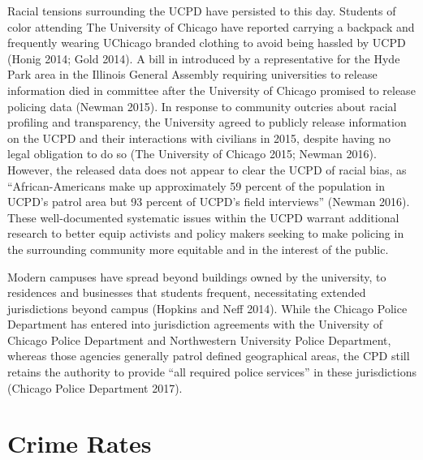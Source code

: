 \documentclass{ucetd}
\begin{document}
Racial tensions surrounding the UCPD have persisted to this day.
Students of color attending The University of Chicago have reported
carrying a backpack and frequently wearing UChicago branded clothing to
avoid being hassled by UCPD (Honig 2014; Gold 2014). A bill in
introduced by a representative for the Hyde Park area in the Illinois
General Assembly requiring universities to release information died in
committee after the University of Chicago promised to release policing
data (Newman 2015). In response to community outcries about racial
profiling and transparency, the University agreed to publicly release
information on the UCPD and their interactions with civilians in 2015,
despite having no legal obligation to do so (The University of Chicago
2015; Newman 2016). However, the released data does not appear to clear
the UCPD of racial bias, as ``African-Americans make up approximately 59
percent of the population in UCPD's patrol area but 93 percent of UCPD's
field interviews'' (Newman 2016). These well-documented systematic
issues within the UCPD warrant additional research to better equip
activists and policy makers seeking to make policing in the surrounding
community more equitable and in the interest of the public.

Modern campuses have spread beyond buildings owned by the university, to
residences and businesses that students frequent, necessitating extended
jurisdictions beyond campus (Hopkins and Neff 2014). While the Chicago
Police Department has entered into jurisdiction agreements with the
University of Chicago Police Department and Northwestern University
Police Department, whereas those agencies generally patrol defined
geographical areas, the CPD still retains the authority to provide ``all
required police services'' in these jurisdictions (Chicago Police
Department 2017).

\hypertarget{crime-rates}{%
\section{Crime Rates}\label{crime-rates}}
\end{document}

